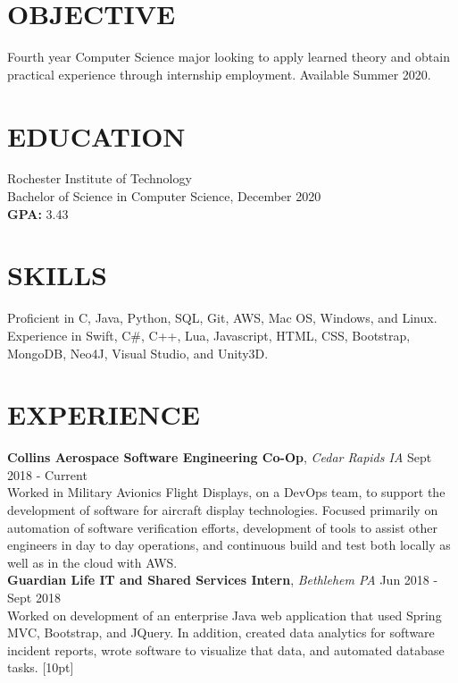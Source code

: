 \documentclass[line, margin]{res}
\begin{document}
\address{(484) 554-8487\\ emp9173@rit.edu}

\begin{resume}
\vspace{-7.5mm} %

\section{OBJECTIVE}
Fourth year Computer Science major looking to apply learned theory and obtain practical experience through internship employment. Available Summer 2020.

\section{EDUCATION} 
 Rochester Institute of Technology \\
 Bachelor of Science in Computer Science, December 2020\\
 \textbf{GPA:} 3.43
 
\section{SKILLS}
Proficient in C, Java, Python, SQL, Git, AWS, Mac OS, Windows, and Linux. \\
Experience in Swift, C\#, C++, Lua, Javascript, HTML, CSS, Bootstrap, MongoDB, Neo4J, Visual Studio, and Unity3D.
 
 
\section{EXPERIENCE} 
\textbf{Collins Aerospace Software Engineering Co-Op}, \textit{Cedar Rapids IA} \hfill Sept 2018 - Current \\
Worked in Military Avionics Flight Displays, on a DevOps team, to support the development of software for aircraft display technologies.  Focused primarily on automation of software verification efforts, development of tools to assist other engineers in day to day operations, and continuous build and test both locally as well as in the cloud with AWS. \\ [10pt]
\textbf{Guardian Life IT and Shared Services Intern}, \textit{Bethlehem PA} \hfill Jun 2018 - Sept 2018 \\
Worked on development of an enterprise Java web application that used Spring MVC, Bootstrap, and JQuery.  In addition, created
data analytics for software incident reports, wrote software to visualize that data, and automated database tasks. [10pt]



\end{resume}
\end{document}
